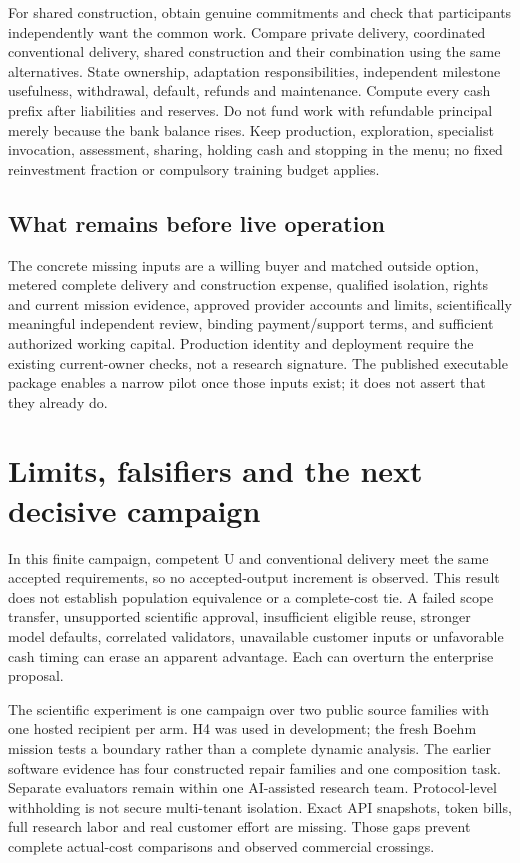 \documentclass[11pt,letterpaper]{article}
\begin{document}
For shared construction, obtain genuine commitments and check that participants independently want the common work. Compare private delivery, coordinated conventional delivery, shared construction and their combination using the same alternatives. State ownership, adaptation responsibilities, independent milestone usefulness, withdrawal, default, refunds and maintenance. Compute every cash prefix after liabilities and reserves. Do not fund work with refundable principal merely because the bank balance rises. Keep production, exploration, specialist invocation, assessment, sharing, holding cash and stopping in the menu; no fixed reinvestment fraction or compulsory training budget applies.

\subsection{What remains before live operation}
The concrete missing inputs are a willing buyer and matched outside option, metered complete delivery and construction expense, qualified isolation, rights and current mission evidence, approved provider accounts and limits, scientifically meaningful independent review, binding payment/support terms, and sufficient authorized working capital. Production identity and deployment require the existing current-owner checks, not a research signature. The published executable package enables a narrow pilot once those inputs exist; it does not assert that they already do.

\section{Limits, falsifiers and the next decisive campaign}
In this finite campaign, competent U and conventional delivery meet the same accepted requirements, so no accepted-output increment is observed. This result does not establish population equivalence or a complete-cost tie. A failed scope transfer, unsupported scientific approval, insufficient eligible reuse, stronger model defaults, correlated validators, unavailable customer inputs or unfavorable cash timing can erase an apparent advantage. Each can overturn the enterprise proposal.

The scientific experiment is one campaign over two public source families with one hosted recipient per arm. H4 was used in development; the fresh Boehm mission tests a boundary rather than a complete dynamic analysis. The earlier software evidence has four constructed repair families and one composition task. Separate evaluators remain within one AI-assisted research team. Protocol-level withholding is not secure multi-tenant isolation. Exact API snapshots, token bills, full research labor and real customer effort are missing. Those gaps prevent complete actual-cost comparisons and observed commercial crossings.
\end{document}
